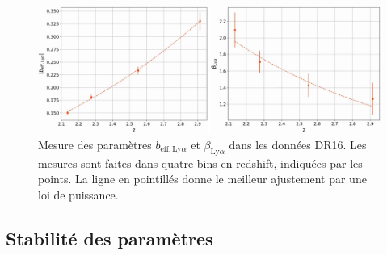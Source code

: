 \begin{figure}
  \centering
  \includegraphics[scale=0.44]{bias_vs_z}
  \caption{Mesure des paramètres $b_{\mathrm{eff},\mathrm{Ly}\alpha}$ et $\beta_{\mathrm{Ly}\alpha}$ dans les données DR16. Les mesures sont faites dans quatre bins en redshift, indiquées par les points. La ligne en pointillés donne le meilleur ajustement par une loi de puissance.}
  \label{fig:bias_vs_z}
\end{figure}





\subsection{Stabilité des paramètres \lya{}}
\label{subsec:stab_pars_lya}


